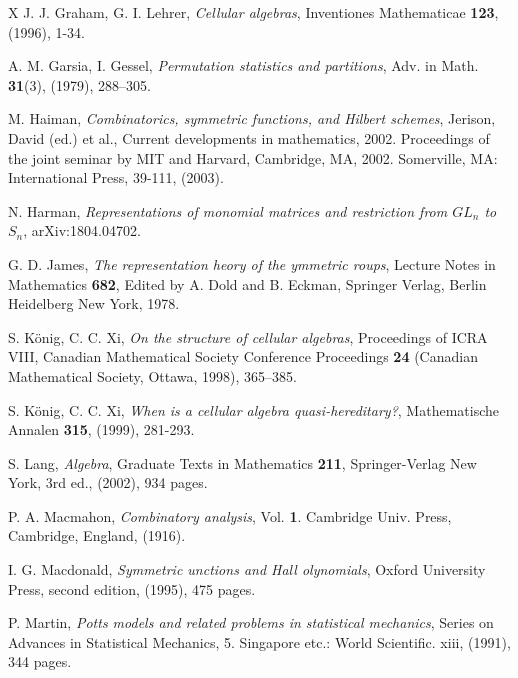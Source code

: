\documentclass[10pt,hidelinks]{article}
\numberwithin{equation}{section}
\begin{document}
\begin{thebibliography}{X}
J. J. Graham, G. I. Lehrer,
  \textit{Cellular algebras}, Inventiones Mathematicae {\bf 123}, (1996), 1-34.

A. M. Garsia, I. Gessel, {\it Permutation statistics and partitions}, Adv. in Math. {\bf 31}(3),
  (1979), 288–305.


M. Haiman, 
{\it Combinatorics, symmetric functions, and Hilbert schemes}, 
Jerison, David (ed.) et al., Current developments in mathematics, 2002.
Proceedings of the joint seminar by MIT and Harvard, Cambridge, MA, 2002.
Somerville, MA: International Press, 39-111, (2003). 
  

N. Harman, \textit{Representations of monomial matrices and restriction from $GL_n$ to $S_n$}, arXiv:1804.04702.



  
G. D. James, {\it The representation
  {\it {\color{black}{t}}}heory of the {\it {\color{black}{s}}}ymmetric
  {\it {\color{black}{g}}}roups},
  Lecture Notes in Mathematics {\bf 682}, Edited by A. Dold and B. Eckman,
  Springer Verlag, Berlin Heidelberg New York, 1978. 


  
S. K\"onig, C. C. Xi, {\it On the structure of cellular algebras},  Proceedings of ICRA VIII, Canadian
Mathematical Society Conference Proceedings {\bf 24} (Canadian Mathematical Society, Ottawa,
1998), 365–385.


S. K\"onig, C. C. Xi, {\it
When is a cellular algebra quasi-hereditary?}, Mathematische Annalen {\bf 315}, (1999), 281-293.
 





S. Lang, {\it Algebra}, Graduate Texts in Mathematics {\bf 211},
Springer-Verlag New York, 3rd ed., (2002), 934 pages. 



P. A. Macmahon, 
\textit{Combinatory analysis}, Vol. {\bf 1}. Cambridge Univ. Press, Cambridge, England, (1916).



I. G. Macdonald, 
\textit{Symmetric {\it {\color{black}{f}}}unctions and Hall {\it {\color{black}{p}}}olynomials},
Oxford University Press, second edition, (1995), 475 pages. 



P. Martin, 
  \textit{Potts models and related problems in statistical mechanics},
  Series on Advances in Statistical Mechanics, 5. Singapore etc.: World Scientific. xiii, 
  (1991), 344 pages.


\end{thebibliography}
\end{document}

